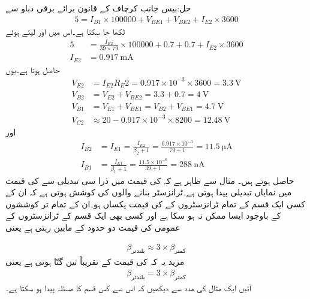 حل:بیس جانب کرچاف کے قانون برائے برقی دباو سے
\begin{align*}
5=I_{B1} \times 100000+V_{BE1}+V_{BE2}+I_{E2} \times 3600
\end{align*}
لکھا جا سکتا ہے۔اس میں  اور  لیتے ہوئے
\begin{align*}
5&=\frac{I_{E2}}{39 \times 79} \times 100000+0.7+0.7+I_{E2} \times 3600\\
I_{E2}&=\SI{0.917}{\milli \ampere}
\end{align*}
حاصل ہوتا ہے۔یوں
\begin{align*}
V_{E2}&=I_{E2} R_E2=0.917 \times 10^{-3} \times 3600=\SI{3.3}{\volt}\\
V_{B2}&=V_{E2}+V_{BE2}=3.3+0.7=\SI{4}{\volt}\\
V_{B1}&=V_{E1}+V_{BE1}=V_{B2}+V_{BE1}=\SI{4.7}{\volt}\\
V_{C2}& \approx 20-0.917 \times 10^{-3} \times  8200=\SI{12.48}{\volt}
\end{align*}
اور
\begin{align*}
I_{B2}&=I_{E1}=\frac{I_{E2}}{\beta_2+1}=\frac{0.917 \times 10^{-3}}{79+1}=\SI{11.5}{\micro \ampere}\\
I_{B1}&=\frac{I_{E1}}{\beta_1+1}=\frac{11.5 \times 10^{-6}}{39+1}=\SI{288}{\nano \ampere}
\end{align*}
حاصل ہوتے ہیں۔
 \label{حصہ_تبدیلی_بٹا_سے_نکتہ_کارکردگی_کا_سرک_جانا}
مثال  سے ظاہر ہے کہ  کی قیمت میں ذرا سی تبدیلی سے  کی قیمت میں نمایاں تبدیلی پیدا ہوتی ہے۔ٹرانزسٹر بنانے والوں کی کوشش ہوتی ہے کہ ان کے کسی  ایک قسم کے تمام ٹرانزسٹروں کے  کی قیمت یکساں ہو۔ان کے تمام تر کوششوں کے باوجود ایسا ممکن نہ ہو سکا ہے اور کسی بھی ایک قسم کے ٹرانزسٹروں کے عمومی    کی قیمت دو حدود کے مابین رہتی ہے یعنی

\begin{align}
\beta_{\textrm{بلندتر}} \approx  3 \times \beta_{\textrm{کمتر}}
\end{align}
مزید یہ کہ  کی قیمت  کے تقریباً تین گنّا ہوتی ہے یعنی
\begin{align}
\beta_{\textrm{بلندتر}} =   { 3 \times \beta_{\textrm{کمتر}}}
\end{align}
آئیں ایک مثال کی مدد سے دیکھیں کہ اس سے کس قسم کا مسئلہ پیدا ہو سکتا ہے۔

